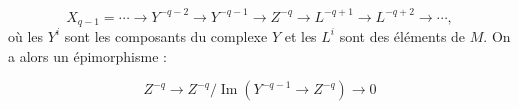 \[
X_{q-1}=\cdots\longrightarrow Y^{-q-2}\longrightarrow Y^{-q-1}
\longrightarrow Z^{-q}\longrightarrow L^{-q+1}\longrightarrow L^{-q+2}
\longrightarrow\cdots,
\]
où les $Y^i$ sont les composants du complexe $Y$ et les $L^i$ sont des
éléments de $M$. On a alors un épimorphisme :

\[
Z^{-q}\longrightarrow
Z^{-q}/\operatorname{Im}(Y^{-q-1}\longrightarrow Z^{-q})
\longrightarrow0
\]
\endgroup
